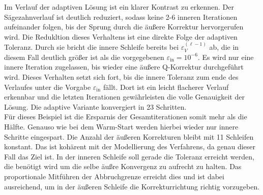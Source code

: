 
Im Verlauf der adaptiven Lösung ist ein klarer Kontrast zu erkennen.
Der Sägezahnverlauf ist deutlich reduziert, sodass keine 2-6 inneren Iterationen aufeinander folgen, bis der Sprung durch die äußere Korrektur hervorgerufen wird.
Die Redukltion dieses Verhaltens ist eine direkte Folge der adaptiven Toleranz.
Durch sie bricht die innere Schleife bereits bei $\varepsilon_V^{(\ell-1)}$ ab, die in diesem Fall deutlich größer ist als die vorgegebenen $\varepsilon_\mathrm{in} = 10^{-6}$.
Es wird nur eine innere Iteration zugelassen, bis wieder eine äußere Q-Korrektur durchgeführt wird.
Dieses Verhalten setzt sich fort, bis die innere Toleranz zum ende des Verlaufes unter die Vorgabe $\varepsilon_\mathrm{in}$ fällt.
Dort ist ein leicht flacherer Verlauf erkennbar und die letzten Iterationen gewährleisten die volle Genauigkeit der Lösung.
Die adaptive Variante konvergiert in 23 Schritten.\\

Für dieses Beispiel ist die Ersparnis der Gesamtiterationen somit mehr als die Hälfte.
Genauso wie bei dem Warm-Start werden hierbei wieder nur innere Schritte eingespart.
Die Anzahl der äußeren Korrekturen bleibt mit 11 Schleifen konstant.
Das ist kohärent mit der Modellierung des Verfahrens, da genau dieser Fall das Ziel ist.
In der inneren Schleife soll gerade die Toleranz erreicht werden, die benötigt wird um die selbe äußre Konvergenz zu aufrecht zu halten.
Das proportionale Mitführen der Abbruchgrenze erreicht dies und ist dabei ausreichend, um in der äußeren Schleife die Korrekturrichtung richtig vorzugeben.

